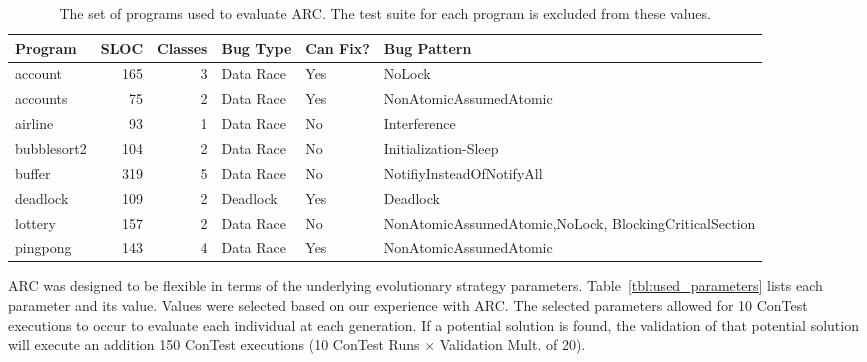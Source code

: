 \begin{table}[h]
\caption{The set of programs used to evaluate ARC. The test suite for each
program is excluded from these values.}
\begin{center}
\begin{tabular}{|l|r|r|l|l|p{4.5cm}|}
\hline
\textbf{Program} & \textbf{SLOC} & \textbf{Classes} & \textbf{Bug Type} & \textbf{Can Fix?} & \textbf{Bug Pattern}\\
\hline
account & 165 & 3 & Data Race & Yes & NoLock\\
\hline
accounts & 75 & 2 & Data Race & Yes & NonAtomicAssumedAtomic\\
\hline
airline & 93 & 1 & Data Race & No & Interference\\
\hline
bubblesort2 & 104 & 2 & Data Race & No & Initialization-Sleep\\
\hline
buffer & 319 & 5 & Data Race & No & NotifiyInsteadOfNotifyAll\\
\hline
deadlock & 109 & 2 & Deadlock & Yes & Deadlock\\
\hline
lottery & 157 & 2 & Data Race & No & NonAtomicAssumedAtomic,\newline NoLock, BlockingCriticalSection\\
\hline
pingpong & 143 & 4 & Data Race & Yes & NonAtomicAssumedAtomic\\
\hline
\end{tabular}
\label{tbl:used_programs}
\end{center}
\end{table}

ARC was designed to be flexible in terms of the underlying evolutionary strategy parameters. Table~\ref{tbl:used_parameters} lists each parameter and its value. Values were selected based on our
experience with ARC. The selected parameters allowed for 10 ConTest executions
to occur to evaluate each individual at each generation. If a potential
solution is found, the validation of that potential solution will execute an
addition 150 ConTest executions (10 ConTest Runs $\times$ Validation Mult. of
20).


